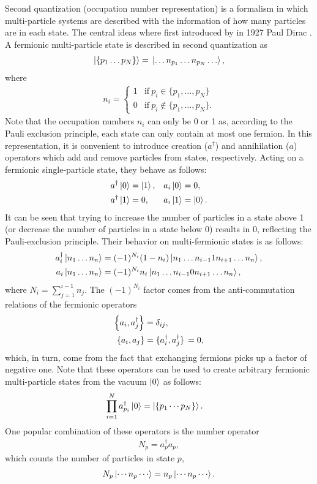 \documentclass[Dual]{msu-thesis}
\newcommand{\dagg}[1]{{#1^{\dagger}}}
\begin{document}
Second quantization (occupation number representation) is a formalism in which multi-particle systems are described with the information of how many particles are in each state. The central ideas where first introduced by in 1927 Paul Dirac \cite{dirac}.  A fermionic multi-particle state is described in second quantization as
\begin{align}
\ket{\{p_1\ldots  p_N\}}
=\ket*{\ldots n_{p_1}\ldots n_{p_N}\ldots},
\end{align}
where 
\begin{align}
n_i=
\begin{cases}
1 & \text{if} \ p_i\in\{p_1,\ldots ,p_N\} \nonumber \\
0 & \text{if} \ p_i\notin\{p_1,\ldots ,p_N\}.
\end{cases}
\end{align}
Note that the occupation numbers $n_i$ can only be 0 or 1 as, according to the Pauli exclusion principle, each state can only contain at most one fermion. In this representation, it is convenient to introduce creation ($a^\dagger$) and annihilation ($a$) operators which add and remove particles from states, respectively. Acting on a fermionic single-particle state, they behave as follows:
\begin{align}
\label{new}
&\dagg{a}\ket{0}=\ket{1}, && a_i\ket{0}=0,
\\
\nonumber
&\dagg{a}\ket{1}=0, && a_i\ket{1}=\ket{0}.
\end{align}
It can be seen that trying to increase the number of particles in a state above 1 (or decrease the number of particles in a state below 0) results in 0, reflecting the Pauli-exclusion principle.
Their behavior on multi-fermionic states is as follows:
\begin{align}
\label{fermionic_op_on_states_def}
\dagg{a_i}\ket{n_1\ldots n_n}&=(-1)^{N_i}(1-n_i)\ket{n_1\ldots n_{i-1}1n_{i+1}\ldots n_n}, \\
a_i\ket{n_1\ldots n_n}&=(-1)^{N_i}n_i\ket{n_1\ldots n_{i-1}0n_{i+1}\ldots n_n},
\end{align}
where $N_i=\sum_{j=1}^{i-1}n_j$. The $(-1)^{N_i}$ factor comes from the anti-commutation relations of the fermionic operators
\begin{align}
\label{fermionic_anticommutation_relations}
\acomm{a_i}{\dagg{a_j}}&=\delta_{ij}, \\
\acomm{a_i}{a_j}&=\acomm*{\dagg{a_i}}{\dagg{a_j}}=0,
\end{align}
which, in turn, come from the fact that exchanging fermions picks up a factor of negative one. Note that these operators can be used to create arbitrary fermionic multi-particle states from the vacuum $\ket{0}$ as follows:
\begin{align}
\prod_{i=1}^Na^{\dagger}_{p_i}\ket{0}&=\ket{\{p_1\cdots p_N\}}.
\end{align}
One popular combination of these operators is the number operator
\begin{align}
N_p= a^\dagger_pa_p,
\end{align}
which counts the number of particles in state $p$,
\begin{align}
N_p\ket{\cdots n_p \cdots} = n_p\ket{\cdots n_p \cdots}.
\end{align}
\end{document}
